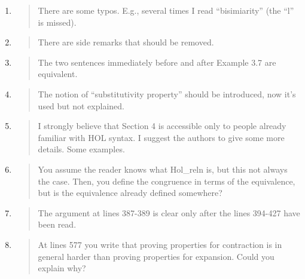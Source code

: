 \begin{enumerate}

\item \begin{quote}
    There are some typos. E.g., several times I read “bisimiarity” (the “l” is missed).
  \end{quote}

\item \begin{quote}
    There are side remarks that should be removed.
  \end{quote}

\item \begin{quote}
    The two sentences immediately before and after Example 3.7 are equivalent.
  \end{quote}

\item \begin{quote}
    The notion of “substitutivity property” should be introduced, now it’s used but not explained.
  \end{quote}

\item \begin{quote}
    I strongly believe that Section 4 is accessible only to people
    already familiar with HOL syntax. I suggest the authors to give
    some more details. Some examples.
  \end{quote}

\item \begin{quote}
    You assume the reader knows what Hol_reln is, but this not always the case. 
Then, you define the congruence in terms of the equivalence, but is
the equivalence already defined somewhere?
  \end{quote}

\item \begin{quote}
    The argument at lines 387-389 is clear only after the lines 394-427 have been read.
  \end{quote}

\item \begin{quote}
    At lines 577 you write that proving properties for contraction is
    in general harder than proving properties for expansion. Could you
    explain why?
  \end{quote}
\end{enumerate}

